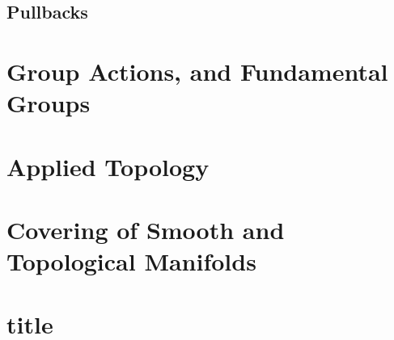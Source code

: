 \documentclass[Total.tex]{subfiles}
\begin{document}
	\subsection{Pullbacks}
	\section{Group Actions, and Fundamental Groups}
	\section{Applied Topology}
	\section{Covering of Smooth and Topological Manifolds}
	\section{title}
\end{document}

